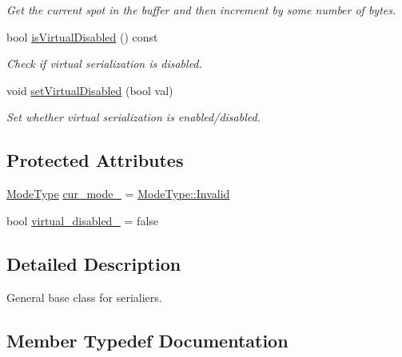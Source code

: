 \begin{DoxyCompactItemize}
\begin{DoxyCompactList}\small\item\em Get the current spot in the buffer and then increment by some number of bytes. \end{DoxyCompactList}\item 
bool \hyperlink{structcheckpoint_1_1_serializer_af45e225cdb3a750a06de80a8cd5c6c37}{is\+Virtual\+Disabled} () const
\begin{DoxyCompactList}\small\item\em Check if virtual serialization is disabled. \end{DoxyCompactList}\item 
void \hyperlink{structcheckpoint_1_1_serializer_af57d7cd51e94dd44a5be184456c2d59f}{set\+Virtual\+Disabled} (bool val)
\begin{DoxyCompactList}\small\item\em Set whether virtual serialization is enabled/disabled. \end{DoxyCompactList}\end{DoxyCompactItemize}
\subsection*{Protected Attributes}
\begin{DoxyCompactItemize}
\item 
\hyperlink{namespacecheckpoint_ae2509499ccd8b1dc48fb535bf8aa3059}{Mode\+Type} \hyperlink{structcheckpoint_1_1_serializer_a89a1f207ad5ff75654cb6d48f432be37}{cur\+\_\+mode\+\_\+} = \hyperlink{namespacecheckpoint_ae2509499ccd8b1dc48fb535bf8aa3059a4bbb8f967da6d1a610596d7257179c2b}{Mode\+Type\+::\+Invalid}
\item 
bool \hyperlink{structcheckpoint_1_1_serializer_a46ef3c0da77d80853882a7cad641c2af}{virtual\+\_\+disabled\+\_\+} = false
\end{DoxyCompactItemize}


\subsection{Detailed Description}
General base class for serialiers. 

\subsection{Member Typedef Documentation}
\mbox{\label{structcheckpoint_1_1_serializer_ad8effc5884f1ed37b6b4507422f6d72c}} 
